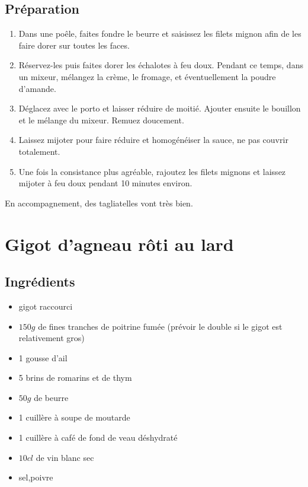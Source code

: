 \subsection*{Préparation}
\begin{enumerate}
\item Dans une poêle, faites fondre le beurre et saisissez les filets mignon afin de les faire dorer sur toutes les faces.
\item Réservez-les puis faites dorer les échalotes à feu doux. Pendant ce temps, dans un mixeur, mélangez la crème, le fromage, et éventuellement la poudre d'amande.
\item Déglacez avec le porto et laisser réduire de moitié. Ajouter ensuite le bouillon et le mélange du mixeur. Remuez doucement.
\item Laissez mijoter pour faire réduire et homogénéiser la sauce, ne pas couvrir totalement. 
\item Une fois la consistance plus agréable, rajoutez les filets mignons et laissez mijoter à feu doux pendant 10 minutes environ.
\end{enumerate}

\begin{remarque}
En accompagnement, des tagliatelles vont très bien.
\end{remarque}




\newpage
\section{Gigot d'agneau rôti au lard}
\subsection*{Ingrédients}
\begin{itemize}
\item gigot raccourci
\item $150\unit{g}$ de fines tranches de poitrine fumée (prévoir le double si le gigot est relativement gros)
\item 1 gousse d'ail
\item 5 brins de romarins et de thym
\item $50\unit{g}$ de beurre
\item 1 cuillère à soupe de moutarde
\item 1 cuillère à café de fond de veau déshydraté
\item $10\unit{cl}$ de vin blanc sec
\item sel,poivre
\end{itemize}

